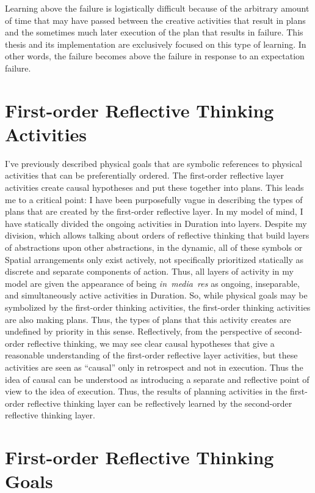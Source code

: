 Learning above the failure is logistically difficult because of the
arbitrary amount of time that may have passed between the creative
activities that result in plans and the sometimes much later execution
of the plan that results in failure.  This thesis and its
implementation are exclusively focused on this type of learning.  In
other words, the failure becomes above the failure in response to an
expectation failure.

\section{First-order Reflective Thinking Activities}

I've previously described physical goals that are symbolic references
to physical activities that can be preferentially ordered.  The
first-order reflective layer activities create causal hypotheses and
put these together into plans.  This leads me to a critical point: I
have been purposefully vague in describing the types of plans that are
created by the first-order reflective layer.  In my model of mind, I
have statically divided the ongoing activities in Duration into
layers.  Despite my division, which allows talking about orders of
reflective thinking that build layers of abstractions upon other
abstractions, in the dynamic, all of these symbols or Spatial
arrangements only exist actively, not specifically prioritized
statically as discrete and separate components of action.  Thus, all
layers of activity in my model are given the appearance of being
\emph{in~media~res} as ongoing, inseparable, and simultaneously active
activities in Duration.  So, while physical goals may be symbolized by
the first-order thinking activities, the first-order thinking
activities are also making plans.  Thus, the types of plans that this
activity creates are undefined by priority in this sense.
Reflectively, from the perspective of second-order reflective
thinking, we may see clear causal hypotheses that give a reasonable
understanding of the first-order reflective layer activities, but
these activities are seen as ``causal'' only in retrospect and not in
execution.  Thus the idea of causal can be understood as introducing a
separate and reflective point of view to the idea of execution.  Thus,
the results of planning activities in the first-order reflective
thinking layer can be reflectively learned by the second-order
reflective thinking layer.

\section{First-order Reflective Thinking Goals}

